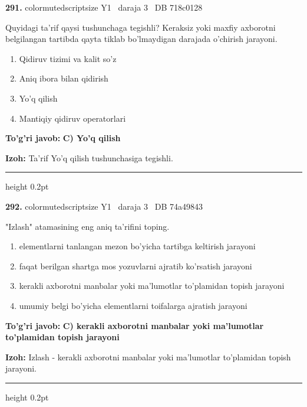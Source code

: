 \documentclass[10pt,a4paper,oneside]{article}
\begin{document}
\noindent\textbf{\color{ink}291.}  {color{muted}scriptsize Y1 \textbullet\ daraja 3 \textbullet\ DB 718c0128}
\par
Quyidagi ta'rif qaysi tushunchaga tegishli? Keraksiz yoki maxfiy axborotni belgilangan tartibda qayta tiklab bo'lmaydigan darajada o'chirish jarayoni.
\begin{enumerate}[label=\Alph*),leftmargin=9mm]
\item Qidiruv tizimi va kalit so'z
\item Aniq ibora bilan qidirish
\item Yo'q qilish
\item Mantiqiy qidiruv operatorlari
\end{enumerate}
\begin{tcolorbox}[enhanced,breakable,colback=teal!4,colframe=teal!50!black,boxrule=0.5pt,arc=1.1mm,left=3mm,right=3mm,top=1.7mm,bottom=1.7mm,before skip=2mm,after skip=2mm]
\textbf{\color{teal}To'g'ri javob:} \textbf{C) Yo'q qilish}
\par\smallskip
\textbf{Izoh:} Ta'rif Yo'q qilish tushunchasiga tegishli.
\end{tcolorbox}
\vspace{2mm}\hrule height 0.2pt \vspace{3mm}

\noindent\textbf{\color{ink}292.}  {color{muted}scriptsize Y1 \textbullet\ daraja 3 \textbullet\ DB 74a49843}
\par
"Izlash" atamasining eng aniq ta'rifini toping.
\begin{enumerate}[label=\Alph*),leftmargin=9mm]
\item elementlarni tanlangan mezon bo'yicha tartibga keltirish jarayoni
\item faqat berilgan shartga mos yozuvlarni ajratib ko'rsatish jarayoni
\item kerakli axborotni manbalar yoki ma'lumotlar to'plamidan topish jarayoni
\item umumiy belgi bo'yicha elementlarni toifalarga ajratish jarayoni
\end{enumerate}
\begin{tcolorbox}[enhanced,breakable,colback=teal!4,colframe=teal!50!black,boxrule=0.5pt,arc=1.1mm,left=3mm,right=3mm,top=1.7mm,bottom=1.7mm,before skip=2mm,after skip=2mm]
\textbf{\color{teal}To'g'ri javob:} \textbf{C) kerakli axborotni manbalar yoki ma'lumotlar to'plamidan topish jarayoni}
\par\smallskip
\textbf{Izoh:} Izlash - kerakli axborotni manbalar yoki ma'lumotlar to'plamidan topish jarayoni.
\end{tcolorbox}
\vspace{2mm}\hrule height 0.2pt \vspace{3mm}
\end{document}
